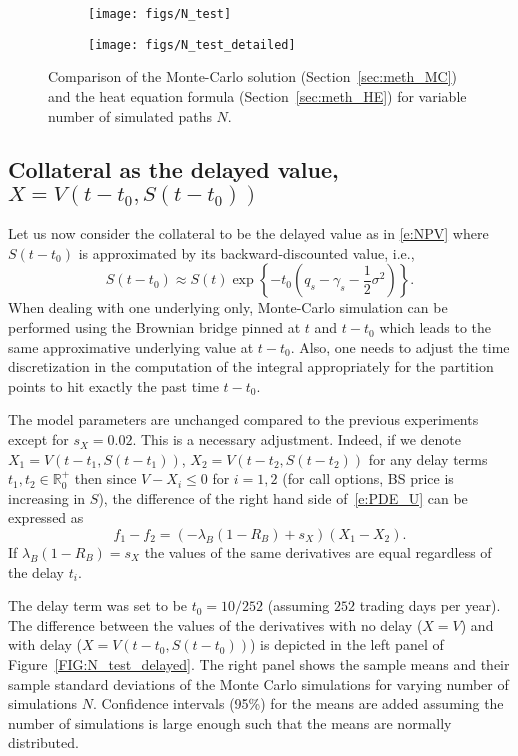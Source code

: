 \documentclass[a4paper,10pt]{article}
\newcommand{\1}{\mathbf{1}}
\begin{document}
{\begin{figure}[!ht]
\centering
\begin{subfigure}[b]{.48\textwidth}
\centering
\texttt{[image: figs/N\_test]}
\end{subfigure}
\begin{subfigure}[b]{.48\textwidth}
\centering
\texttt{[image: figs/N\_test\_detailed]}
\end{subfigure}
\caption{Comparison of the Monte-Carlo solution (Section~\ref{sec:meth_MC}) and the heat equation formula (Section~\ref{sec:meth_HE}) for variable number of simulated paths $N$.} \label{FIG:N_test}
\end{figure}


\subsection{Collateral as the delayed value, \texorpdfstring{$X=V(t-t_0,S(t-t_0))$}{X=V(t-t0,S(t-t0))}}

Let us now consider the collateral to be the delayed value as in \eqref{e:NPV} where $S(t-t_0)$ is approximated by its backward-discounted value, i.e.,
\[ S(t-t_0) \approx S(t) \exp\left\{-t_0(q_s-\gamma_s-\frac{1}{2} \sigma^2)\right\}. \] 
When dealing with one underlying only, Monte-Carlo simulation can be performed using the Brownian bridge pinned at $t$ and $t-t_0$ which leads to the same approximative underlying value at $t-t_0$. Also, one needs to adjust the time discretization in the computation of the integral appropriately for the partition points to hit exactly the past time $t-t_0$.

The model parameters are unchanged compared to the previous experiments except for $s_X = 0.02$. This is a necessary adjustment. Indeed, if we denote $X_1=V(t-t_1,S(t-t_1))$, $X_2 = V(t-t_2,S(t-t_2))$ for any delay terms $t_1, t_2 \in \mathbb{R}^+_0$ then since $V-X_i \leq 0$ for $i =1,2$ (for call options, BS price is increasing in $S$), the difference of the right hand side of~\eqref{e:PDE_U} can be expressed as
\[ f_1- f_2 = (- \lambda_B(1-R_B)+ s_X)(X_1-X_2). \]
If $\lambda_B(1-R_B) = s_X$ the values of the same derivatives are equal regardless of the delay $t_i$.

The delay term was set to be $t_0 = {10}/{252}$ (assuming $252$ trading days per year). The difference between the values of the derivatives with no delay ($X=V$) and with delay ($X=V(t-t_0,S(t-t_0))$) is depicted in the left panel of Figure~\ref{FIG:N_test_delayed}. The right panel shows the sample means and their sample standard deviations of the Monte Carlo simulations for varying number of simulations $N$. Confidence intervals (95\%) for the means are added assuming the number of simulations is large enough such that the means are normally distributed. %

}
\end{document}
